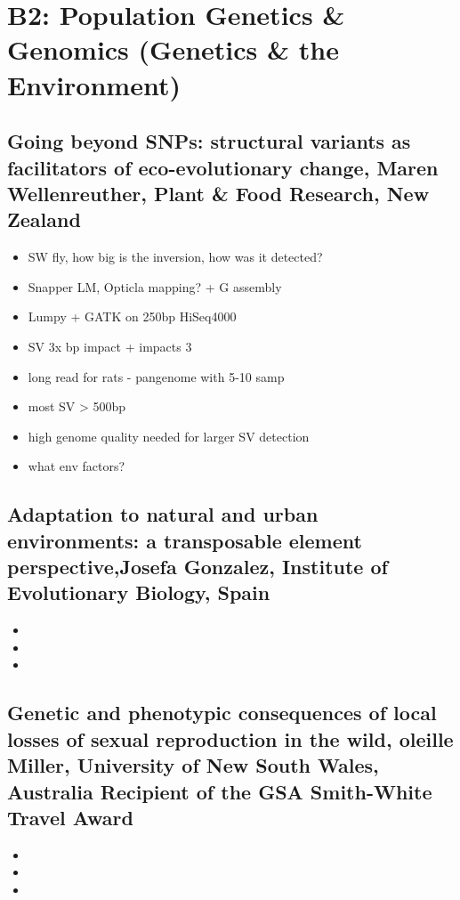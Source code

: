 \documentclass[document.tex]{subfiles}
\begin{document}
    \section{B2: Population Genetics & Genomics (Genetics & the Environment)}

        \subsection{Going beyond SNPs: structural variants as facilitators of eco-evolutionary change, Maren Wellenreuther, Plant & Food Research, New Zealand}
            \begin{itemize}
                \item SW fly, how big is the inversion, how was it detected?
                \item Snapper LM, Opticla mapping? + G assembly
                \item Lumpy + GATK on 250bp HiSeq4000
                \item SV 3x bp impact + impacts 3%
                \item long read for rats - pangenome with 5-10 samp
                \item most SV > 500bp
                \item high genome quality needed for larger SV detection
                \item what env factors?
                \end{itemize} 

        \subsection{Adaptation to natural and urban environments: a transposable element perspective,Josefa Gonzalez, Institute of Evolutionary Biology, Spain }
            \begin{itemize}
                \item 
                \item 
                \item 
                \end{itemize} 

        \subsection{Genetic and phenotypic consequences of local losses of sexual reproduction in the wild, oleille Miller, University of New South Wales, Australia
        Recipient of the GSA Smith-White Travel Award}
            \begin{itemize}
                \item 
                \item 
                \item 
                \end{itemize} 
\end{document}
